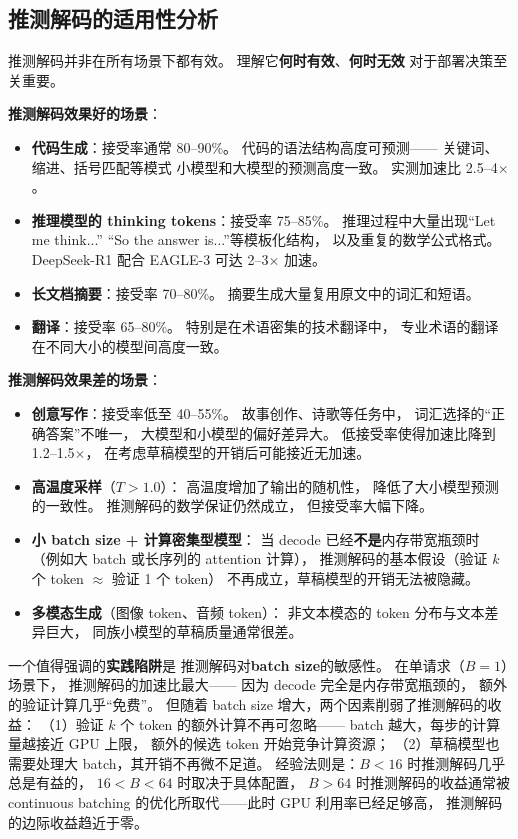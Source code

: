 \subsection{推测解码的适用性分析}

推测解码并非在所有场景下都有效。
理解它\textbf{何时有效}、\textbf{何时无效}
对于部署决策至关重要。

\textbf{推测解码效果好的场景}：
\begin{itemize}[noitemsep]
  \item \textbf{代码生成}：接受率通常 80--90\%。
        代码的语法结构高度可预测——
        关键词、缩进、括号匹配等模式
        小模型和大模型的预测高度一致。
        实测加速比 2.5--4$\times$。
  \item \textbf{推理模型的 thinking tokens}：接受率 75--85\%。
        推理过程中大量出现``Let me think...''
        ``So the answer is...''等模板化结构，
        以及重复的数学公式格式。
        DeepSeek-R1 配合 EAGLE-3 可达 2--3$\times$ 加速。
  \item \textbf{长文档摘要}：接受率 70--80\%。
        摘要生成大量复用原文中的词汇和短语。
  \item \textbf{翻译}：接受率 65--80\%。
        特别是在术语密集的技术翻译中，
        专业术语的翻译在不同大小的模型间高度一致。
\end{itemize}

\textbf{推测解码效果差的场景}：
\begin{itemize}[noitemsep]
  \item \textbf{创意写作}：接受率低至 40--55\%。
        故事创作、诗歌等任务中，
        词汇选择的``正确答案''不唯一，
        大模型和小模型的偏好差异大。
        低接受率使得加速比降到 1.2--1.5$\times$，
        在考虑草稿模型的开销后可能接近无加速。
  \item \textbf{高温度采样}（$T > 1.0$）：
        高温度增加了输出的随机性，
        降低了大小模型预测的一致性。
        推测解码的数学保证仍然成立，
        但接受率大幅下降。
  \item \textbf{小 batch size + 计算密集型模型}：
        当 decode 已经\textbf{不是}内存带宽瓶颈时
        （例如大 batch 或长序列的 attention 计算），
        推测解码的基本假设（验证 $k$ 个 token $\approx$ 验证 1 个 token）
        不再成立，草稿模型的开销无法被隐藏。
  \item \textbf{多模态生成}（图像 token、音频 token）：
        非文本模态的 token 分布与文本差异巨大，
        同族小模型的草稿质量通常很差。
\end{itemize}

一个值得强调的\textbf{实践陷阱}是
推测解码对\textbf{batch size}的敏感性。
在单请求（$B = 1$）场景下，
推测解码的加速比最大——
因为 decode 完全是内存带宽瓶颈的，
额外的验证计算几乎``免费''。
但随着 batch size 增大，两个因素削弱了推测解码的收益：
（1）验证 $k$ 个 token 的额外计算不再可忽略——
batch 越大，每步的计算量越接近 GPU 上限，
额外的候选 token 开始竞争计算资源；
（2）草稿模型也需要处理大 batch，其开销不再微不足道。
经验法则是：$B < 16$ 时推测解码几乎总是有益的，
$16 < B < 64$ 时取决于具体配置，
$B > 64$ 时推测解码的收益通常被 continuous batching
的优化所取代——此时 GPU 利用率已经足够高，
推测解码的边际收益趋近于零。

